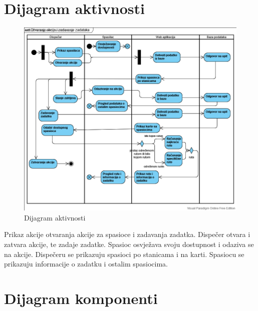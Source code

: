 			\eject 
		
		\section{Dijagram aktivnosti}
			
			\begin{figure}[H]
				\includegraphics[scale=0.5]{slike/act.png}
				\centering
				\caption{Dijagram aktivnosti}
				\label{fig:act}
			\end{figure}
			Prikaz akcije otvaranja akcije za spasioce i zadavanja zadatka. Dispečer otvara i zatvara akcije, te zadaje zadatke. Spasioc osvježava svoju dostupnost i odaziva se na akcije. Dispečeru se prikazuju spasioci po stanicama i na karti. Spasiocu se prikazuju informacije o zadatku i ostalim spasiocima.
			\eject
			
		\section{Dijagram komponenti}
		
